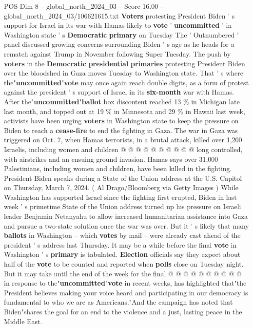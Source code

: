 \begin{textsample}{POS Dim 8 – global\_north\_2024\_03 – Score 16.00 – global\_north\_2024\_03/106621615.txt}  \label{ex:f8_pos_001}
\textbf{Voters} protesting President Biden ' s support for Israel in its war with Hamas likely to \textbf{vote} ' \textbf{uncommitted} ' in Washington state ' s \textbf{Democratic} \textbf{primary} on Tuesday The ' Outnumbered ' panel discussed growing concerns surrounding Biden ' s age as he heads for a rematch against Trump in November following Super Tuesday.
The push by \textbf{voters} in the \textbf{Democratic} \textbf{presidential} \textbf{primaries} protesting President Biden over the bloodshed in Gaza moves Tuesday to Washington state.
That ' s where the"\textbf{uncommitted}"\textbf{vote} may once again reach double digits, as a form of protest against the president ' s support of Israel in its \textbf{six-month} war with Hamas.
After the"\textbf{uncommitted}"\textbf{ballot} box discontent reached 13 \% in Michigan late last month, and topped out at 19 \% in Minnesota and 29 \% in Hawaii last week, activists have been urging \textbf{voters} in Washington state to keep the pressure on Biden to reach a \textbf{cease-fire} to end the fighting in Gaza.
The war in Gaza was triggered on Oct. 7, when Hamas terrorists, in a brutal attack, killed over 1,200 Israelis, including women and children @ @ @ @ @ @ @ @ @ @ long controlled, with airstrikes and an ensuing ground invasion.
Hamas says over 31,000 Palestinians, including women and children, have been killed in the fighting.
President Biden speaks during a State of the Union address at the U.S.
Capitol on Thursday, March 7, 2024. ( Al Drago/Bloomberg via Getty Images ) While Washington has supported Israel since the fighting first erupted, Biden in last week ' s primetime State of the Union address turned up his pressure on Israeli leader Benjamin Netanyahu to allow increased humanitarian assistance into Gaza and pursue a two-state solution once the war was over.
But it ' s likely that many \textbf{ballots} in Washington -- which \textbf{votes} by mail -- were already cast ahead of the president ' s address last Thursday.
It may be a while before the final \textbf{vote} in Washington ' s \textbf{primary} is tabulated. \textbf{Election} officials say they expect about half of the \textbf{vote} to be counted and reported when \textbf{polls} close on Tuesday night.
But it may take until the end of the week for the final @ @ @ @ @ @ @ @ @ @ in response to the"\textbf{uncommitted}"\textbf{vote} in recent weeks, has highlighted that"the President believes making your voice heard and participating in our democracy is fundamental to who we are as Americans."And the campaign has noted that Biden"shares the goal for an end to the violence and a just, lasting peace in the Middle East.

\end{textsample}
